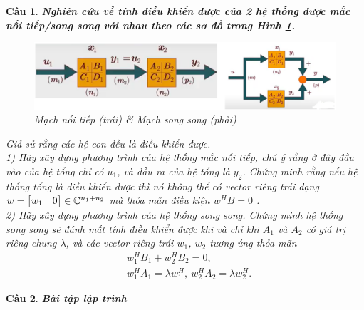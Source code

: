 \documentclass[11pt]{article}
\newtheorem{bt}{Câu}
\begin{document}
\begin{bt} \textbf{Nghiên cứu về tính điều khiển được của 2 hệ thống được mắc nối tiếp/song song với nhau theo các sơ đồ trong Hình \ref{fig:electricalconnection}.} \\

\begin{figure}[!h]
	\centering
	\includegraphics[scale = 0.6]{../Figures/Electrical_connection}
	\caption{Mạch nối tiếp (trái) \& Mạch song song (phải)}
	\label{fig:electricalconnection}
\end{figure}

\noindent Giả sử rằng các hệ con đều là điều khiển được. \\
1) Hãy xây dựng phương trình của hệ thống mắc nối tiếp, chú ý rằng ở đây đầu vào của hệ tổng chỉ có $u_1$, và đầu ra của hệ tổng là $y_2$. Chứng minh rằng nếu hệ thống tổng là điều khiển được thì nó không thể có vector riêng trái dạng $w = \begin{bmatrix} w_1 & 0 \end{bmatrix} \in \mathbb{C}^{n_1+n_2}$ mà thỏa mãn điều kiện $w^H B= 0$ . \\
2) Hãy xây dựng phương trình của hệ thống song song. Chứng minh hệ thống song song sẽ đánh mất tính điều khiển được khi và chỉ khi $A_1$ và $A_2$ có giá trị riêng chung $\lambda$, và các vector riêng trái $w_1$, $w_2$ tương ứng thỏa mãn
\begin{align*}
	& w^H_1 B_1 + w^H_2 B_2 = 0, \\
	& w^H_1 A_1 = \lambda w^H_1,   \   w^H_2 A_2 = \lambda w^H_2.
\end{align*}
\end{bt}


\begin{bt} \textbf{Bài tập lập trình} \\
\end{bt}   

	
\end{document}
